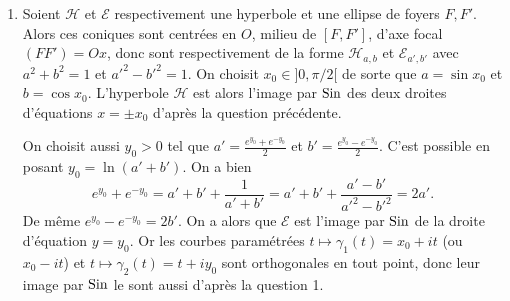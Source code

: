 \begin{enumerate}
\item 
Soient $\mathcal H$ et $\mathcal E$ respectivement une hyperbole et une ellipse de foyers $F,F'$.
 Alors ces coniques sont centrées en $O$, milieu de $[F,F']$, d'axe focal $(FF') = Ox$, donc sont
  respectivement de la forme $\mathcal H_{a,b}$ et $\mathcal E_{a',b'}$ avec $a^2+b^2 =1$ et 
  $a'^2 - b'^2 =1$. On choisit $x_0 \in ]0,\pi/2[$ de sorte que $a = \sin x_0$ et $b = \cos x_0$.
L'hyperbole $\mathcal H$ est alors l'image par $\textnormal{Sin}$ des deux droites d'équations $x = \pm x_0$ 
d'apr\`es la question précédente. 
\par
On choisit aussi $y_0 >0$ tel que $a' = \frac{e^{y_0}+ e^{-y_0}}{2}$ et $b' = \frac{e^{y_0}- e^{-y_0}}{2}$. C'est possible en posant $y_0 = \ln (a'+ b')$. On a bien 
$$e^{y_0}+  e^{-y_0} = a'+b'  + \frac1{a'+b'} = a'+ b' + \frac{a'-b'}{a'^2-b'^2} = 2a'.$$
 De m\^eme 
$e^{y_0} - e^{-y_0} = 2b'$. On a alors que $\mathcal E$ est l'image par $\textnormal{Sin}$ de la droite d'équation $y=y_0$. Or les courbes paramétrées $t \mapsto \gamma_1(t) = x_0 + it$ (ou $x_0 -it$) et $t \mapsto \gamma_2(t) = t+iy_0$ sont orthogonales en tout point, donc leur image par $\textnormal{Sin}$ le sont aussi d'apr\`es la question 1. 
\end{enumerate}
